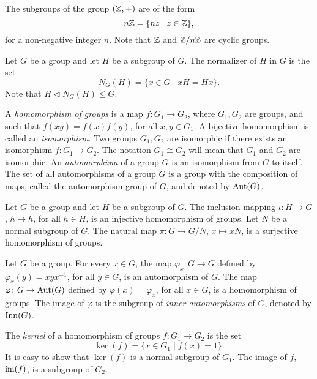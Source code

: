 \begin{example}
	The subgroups of the group $(\mathbb{Z},+)$ are of the form
	$$n\mathbb{Z}=\{ nz\mid z\in\mathbb{Z}\},$$
	for a non-negative integer $n$. Note that $\mathbb{Z}$ and $\mathbb{Z}/n\mathbb{Z}$ are cyclic groups.  
	\end{example} 

\begin{example} Let $G$ be a group and let $H$ be a subgroup of $G$. The normalizer of $H$ in $G$ is the set
	$$N_G(H)=\{ x\in G\mid xH=Hx\}.$$
	Note that $H\lhd N_G(H)\leq G$.
	\end{example}

A {\em homomorphism of groups} is a map $f\colon G_1\rightarrow G_2$, where $G_1,G_2$ are groups, and such that $f(xy)=f(x)f(y)$, for all $x,y\in G_1$. A bijective homomorphism is called an {\em isomorphism}. Two groups $G_1,G_2$ are isomorphic if there exists an isomorphism $f\colon G_1\rightarrow G_2$. The notation $G_1\cong G_2$ will mean that $G_1$ and $G_2$ are isomorphic. An {\em automorphism} of a group $G$ is an isomorphism from $G$ to itself. The set of all automorphisms of a group $G$ is a group with the composition of maps, called the automorphism group of $G$, and denoted by $\operatorname{Aut}(G)$.

\begin{example} Let $G$ be a group and let $H$ be a subgroup of $G$. The inclusion mapping $\iota\colon H\rightarrow G$, $h\mapsto h$, for all $h\in H$, is an injective homomorphism of groups. Let $N$ be a normal subgroup of $G$. The natural map $\pi\colon G\rightarrow G/N$, $x\mapsto xN$, is a surjective homomorphism of groups.  
	\end{example}

\begin{example}
	Let $G$ be a group. For every $x\in G$, the map $\varphi_x\colon G\rightarrow G$ defined by $\varphi_x(y)=xyx^{-1}$, for all $y\in G$, is an automorphism of $G$. The map $\varphi\colon G\rightarrow \operatorname{Aut}(G)$ defined by $\varphi(x)=\varphi_x$, for all $x\in G$, is a homomorphism of groups. The image of $\varphi$ is the subgroup of {\em inner automorphisms} of $G$, denoted by $\mathrm{Inn}(G)$.
	\end{example}
 
The {\em kernel} of a homomorphism of groups $f\colon G_1\rightarrow G_2$ is the set
$$\ker (f)=\{ x\in G_1\mid f(x)=1\}.$$
It is easy to show that $\ker(f)$ is a normal subgroup of $G_1$. The image of $f$, $\operatorname{im}(f)$, is a subgroup of $G_2$.

